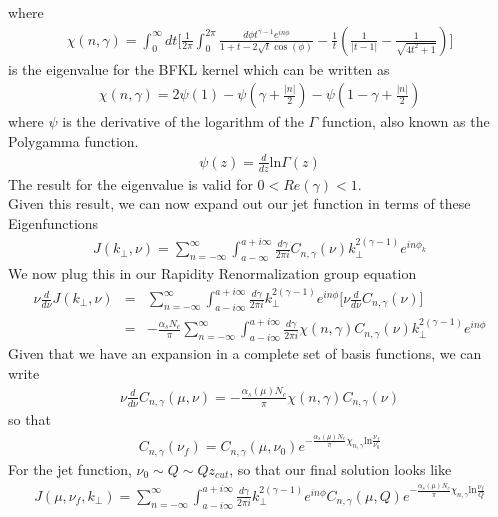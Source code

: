 \documentclass[letter,11pt]{article}
\newcommand{\nn}{\nonumber}
\newcommand{\bea}{\begin{eqnarray}}
\newcommand{\eea}{\end{eqnarray}}
\def\ln{\textrm{ln}}
\def\nn{\nonumber}
\begin{document}
where 
\bea
\chi(n,\gamma) = \int_0^{\infty} dt\Bigg[\frac{1}{2\pi}\int_0^{2\pi} \frac{d\phi t^{\gamma-1}e^{in\phi}}{1+t-2\sqrt{t}\cos(\phi)}-\frac{1}{t}\left(\frac{1}{|t-1|}-\frac{1}{\sqrt{4t^2+1}}\right)\Bigg]
\eea
is the eigenvalue for the BFKL kernel which can be written as 
\bea
\chi(n,\gamma)=2 \psi(1)-\psi\left(\gamma+\frac{|n|}{2}\right)-\psi\left(1-\gamma+\frac{|n|}{2}\right)
\eea
where $\psi$ is the derivative of the logarithm of the $\Gamma$ function, also known as the Polygamma function. 
\bea
\psi(z) =\frac{d}{dz} \ln \Gamma(z) 
\eea
The result for the eigenvalue is valid for $0< Re(\gamma)<1$. \\
Given this result, we can now expand out our jet function in terms of these Eigenfunctions 
\bea
J(k_{\perp},\nu)=\sum_{n=-\infty}^{\infty} \int_{a-\infty}^{a+i\infty}\frac{d\gamma}{2\pi i}C_{n,\gamma}(\nu) k_{\perp}^{2(\gamma-1)}e^{in\phi_k}
\eea
We now plug this in our Rapidity Renormalization group equation 
\bea
\nu \frac{d}{d\nu}J(k_{\perp},\nu) &=& \sum_{n=-\infty}^{\infty}\int_{a-i\infty}^{a+i\infty}\frac{d\gamma}{2\pi i} k_{\perp}^{2(\gamma-1)}e^{in\phi} \Bigg[\nu \frac{d}{d\nu}C_{n,\gamma}(\nu)\Bigg] \nn\\
&=& -\frac{\alpha_sN_c}{\pi}\sum_{n=-\infty}^{\infty}\int_{a-i\infty}^{a+i\infty}\frac{d\gamma}{2\pi i} \chi(n,\gamma)C_{n,\gamma}(\nu)k_{\perp}^{2(\gamma-1)}e^{in\phi}\nn
\eea
Given that we have an expansion in a complete set of basis functions, we can write 
\bea
 \nu \frac{d}{d\nu}C_{n,\gamma}(\mu, \nu) = -\frac{\alpha_s(\mu) N_c}{\pi}\chi(n,\gamma)C_{n,\gamma}(\nu)
\eea
so that 
\bea
 C_{n,\gamma}(\nu_f) = C_{n,\gamma}(\mu, \nu_0)e^{ -\frac{\alpha_s(\mu) N_c}{\pi}\chi_{n,\gamma}\ln \frac{\nu_f}{\nu_0}} 
\eea
For the jet function, $\nu_0 \sim Q \sim Qz_{cut}$, so that our final solution looks like 
\bea
J(\mu, \nu_f, k_{\perp}) =\sum_{n=-\infty}^{\infty}\int_{a-i\infty}^{a+i\infty}\frac{d\gamma}{2\pi i} k_{\perp}^{2(\gamma-1)}e^{in\phi}  C_{n,\gamma}(\mu, Q)e^{ -\frac{\alpha_s(\mu) N_c}{\pi}\chi_{n,\gamma}\ln \frac{\nu_f}{Q}}  
\eea
\end{document}
